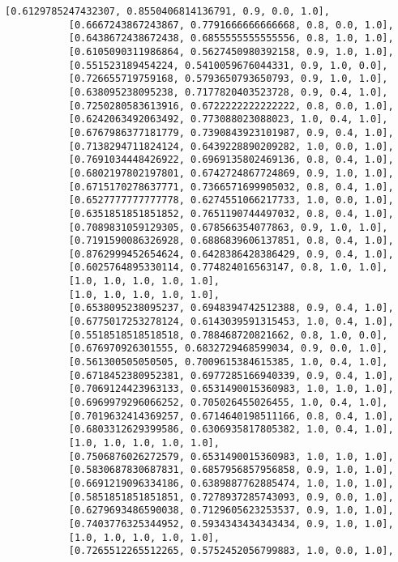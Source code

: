 \documentclass[11pt]{article}
\begin{document}
\begin{Verbatim}[commandchars=\\\{\}]
           [0.6129785247432307, 0.8550406814136791, 0.9, 0.0, 1.0],
           [0.6667243867243867, 0.7791666666666668, 0.8, 0.0, 1.0],
           [0.6438672438672438, 0.6855555555555556, 0.8, 1.0, 1.0],
           [0.6105090311986864, 0.5627450980392158, 0.9, 1.0, 1.0],
           [0.551523189454224, 0.5410059676044331, 0.9, 1.0, 0.0],
           [0.726655719759168, 0.5793650793650793, 0.9, 1.0, 1.0],
           [0.638095238095238, 0.7177820403523728, 0.9, 0.4, 1.0],
           [0.7250280583613916, 0.6722222222222222, 0.8, 0.0, 1.0],
           [0.6242063492063492, 0.773088023088023, 1.0, 0.4, 1.0],
           [0.6767986377181779, 0.7390843923101987, 0.9, 0.4, 1.0],
           [0.7138294711824124, 0.6439228890209282, 1.0, 0.0, 1.0],
           [0.7691034448426922, 0.6969135802469136, 0.8, 0.4, 1.0],
           [0.6802197802197801, 0.6742724867724869, 0.9, 1.0, 1.0],
           [0.6715170278637771, 0.7366571699905032, 0.8, 0.4, 1.0],
           [0.6527777777777778, 0.6274551066217733, 1.0, 0.0, 1.0],
           [0.6351851851851852, 0.7651190744497032, 0.8, 0.4, 1.0],
           [0.7089831059129305, 0.678566354077863, 0.9, 1.0, 1.0],
           [0.7191590086326928, 0.6886839606137851, 0.8, 0.4, 1.0],
           [0.8762999452654624, 0.6428386428386429, 0.9, 0.4, 1.0],
           [0.6025764895330114, 0.774824016563147, 0.8, 1.0, 1.0],
           [1.0, 1.0, 1.0, 1.0, 1.0],
           [1.0, 1.0, 1.0, 1.0, 1.0],
           [0.6538095238095237, 0.6948394742512388, 0.9, 0.4, 1.0],
           [0.6775017253278124, 0.6143039591315453, 1.0, 0.4, 1.0],
           [0.5518518518518518, 0.788468720821662, 0.8, 1.0, 0.0],
           [0.676970926301555, 0.6832729468599034, 0.9, 0.0, 1.0],
           [0.561300505050505, 0.7009615384615385, 1.0, 0.4, 1.0],
           [0.6718452380952381, 0.6977285166940339, 0.9, 0.4, 1.0],
           [0.7069124423963133, 0.6531490015360983, 1.0, 1.0, 1.0],
           [0.6969979296066252, 0.705026455026455, 1.0, 0.4, 1.0],
           [0.7019632414369257, 0.6714640198511166, 0.8, 0.4, 1.0],
           [0.6803312629399586, 0.6306935817805382, 1.0, 0.4, 1.0],
           [1.0, 1.0, 1.0, 1.0, 1.0],
           [0.7506876026272579, 0.6531490015360983, 1.0, 1.0, 1.0],
           [0.5830687830687831, 0.6857956857956858, 0.9, 1.0, 1.0],
           [0.6691219096334186, 0.6389887762885474, 1.0, 1.0, 1.0],
           [0.5851851851851851, 0.7278937285743093, 0.9, 0.0, 1.0],
           [0.6279693486590038, 0.7129605623253537, 0.9, 1.0, 1.0],
           [0.7403776325344952, 0.5934343434343434, 0.9, 1.0, 1.0],
           [1.0, 1.0, 1.0, 1.0, 1.0],
           [0.7265512265512265, 0.5752452056799883, 1.0, 0.0, 1.0],

\end{Verbatim}
\end{document}
